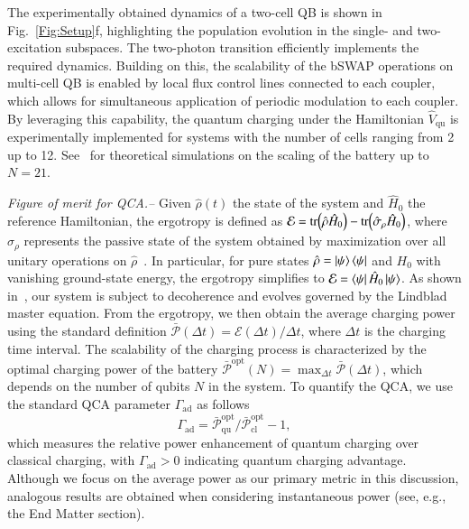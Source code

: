 \documentclass[aps,prl,epsfigure,twocolumn,superscriptaddress]{revtex4-2}
\newcommand{\Ecal}{\mathcal{E}}
\newcommand{\Pcal}{\mathcal{P}}
\newcommand{\1}{\mathbbm{1}}
\newcommand{\SubFig}[2]{\ref{#1}{\color{blue}#2}}
\newcommand{\RefB}[1]{{\color{black}#1}}
\newcommand{\RefC}[1]{{\color{black}#1}}
\begin{document}
	The experimentally obtained dynamics of a two-cell QB is shown in Fig.~\SubFig{Fig:Setup}{f}, highlighting the population evolution in the single- and two-excitation subspaces. The two-photon transition efficiently implements the required dynamics. Building on this, the scalability of the bSWAP operations on multi-cell QB is enabled by local flux control lines connected to each coupler, which allows for simultaneous application of periodic modulation to each coupler. By leveraging this capability, the quantum charging under the Hamiltonian $\hat{V}_{\mathrm{qu}}$ is \RefB{experimentally} implemented for systems with the number of cells ranging from 2 up to 12. \RefB{See~\cite{SM} for theoretical simulations on the scaling of the battery up to $N=21$}.


	\emph{Figure of merit for QCA.--} Given $\hat{\rho}(t)$ the state of the system and $\hat{H}_{0}$ the reference Hamiltonian, the ergotropy is defined as $\Ecal = \tr(\hat{\rho} \hat{H}_{0}) - \tr(\hat{\sigma}_{\rho} \hat{H}_{0})$, where $\hat{\sigma}_{\rho}$ represents the passive state of the system obtained by maximization over all unitary operations on $\hat{\rho}$~\cite{Allahverdyan:04}. In particular, for pure states $\hat{\rho}=\ket{\psi}\bra{\psi}$ and $H_0$ with vanishing ground-state energy, the ergotropy simplifies to $\Ecal = \bra{\psi}\hat{H}_{0}\ket{\psi}$. As shown in~\cite{SM}, our system is subject to decoherence and evolves governed by the Lindblad master equation.
	From the ergotropy, we then obtain the average charging power using the standard definition $\bar{\Pcal} (\Delta t) = \Ecal (\Delta t) / \Delta t $, where $\Delta t$ is the charging time interval. The scalability of the charging process is characterized by the optimal charging power of the battery $\bar{\Pcal}^{\mathrm{opt}} (N) = \max_{\Delta t} \bar{\Pcal} (\Delta t)$, which depends on the number of qubits $N$ in the system.  To quantify the QCA, we \RefB{use the standard QCA parameter $\Gamma_{\mathrm{ad}}$ as \RefC{follows}~\cite{PRL2017Binder,Kim:22}}
	\begin{equation}
		\Gamma_{\mathrm{ad}} = \bar{\Pcal}^{\mathrm{opt}}_{\mathrm{qu}}  / \bar{\Pcal}^{\mathrm{opt}}_{\mathrm{cl}}  - 1 , \label{Eq:AdParameter}
	\end{equation}
	which measures the relative power enhancement of quantum charging over classical charging, with $\Gamma_{\mathrm{ad}} > 0$ indicating quantum charging advantage. \RefC{Although we focus on the average power as our primary metric in this discussion, analogous results are obtained when considering instantaneous power (see, e.g., the End Matter section).}
\end{document}
